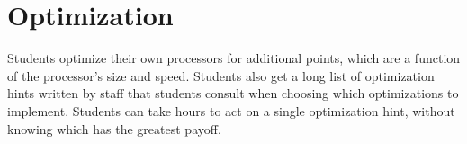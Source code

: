 \documentclass{chi-ext}
\begin{document}

\section{Optimization}%

Students optimize their own processors for additional points, which are a function of the processor's size and speed. Students also get a long list of optimization hints written by staff that students consult when choosing which optimizations to implement. Students can take hours to act on a single optimization hint, without knowing which has the greatest payoff.
\end{document}
